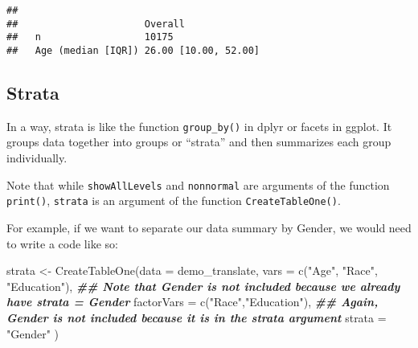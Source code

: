 \documentclass[
]{book}
\newenvironment{Shaded}{\begin{snugshade}}{\end{snugshade}}
\newcommand{\AttributeTok}[1]{\textcolor[rgb]{0.77,0.63,0.00}{#1}}
\newcommand{\DocumentationTok}[1]{\textcolor[rgb]{0.56,0.35,0.01}{\textbf{\textit{#1}}}}
\newcommand{\FunctionTok}[1]{\textcolor[rgb]{0.00,0.00,0.00}{#1}}
\newcommand{\NormalTok}[1]{#1}
\newcommand{\OtherTok}[1]{\textcolor[rgb]{0.56,0.35,0.01}{#1}}
\newcommand{\SpecialCharTok}[1]{\textcolor[rgb]{0.00,0.00,0.00}{#1}}
\newcommand{\StringTok}[1]{\textcolor[rgb]{0.31,0.60,0.02}{#1}}
\begin{document}
\begin{Shaded}
\end{Shaded}

\begin{verbatim}
##
##                      Overall
##   n                  10175
##   Age (median [IQR]) 26.00 [10.00, 52.00]
\end{verbatim}

\hypertarget{strata}{%
\subsection{Strata}\label{strata}}

In a way, strata is like the function \texttt{group\_by()} in dplyr or facets in ggplot. It groups data together into groups or ``strata'' and then summarizes each group individually.

Note that while \texttt{showAllLevels} and \texttt{nonnormal} are arguments of the function \texttt{print()}, \texttt{strata} is an argument of the function \texttt{CreateTableOne()}.

For example, if we want to separate our data summary by Gender, we would need to write a code like so:

\begin{Shaded}
\begin{Highlighting}[]
\NormalTok{strata }\OtherTok{\textless{}{-}} \FunctionTok{CreateTableOne}\NormalTok{(}\AttributeTok{data =}\NormalTok{ demo\_translate,}
                         \AttributeTok{vars =} \FunctionTok{c}\NormalTok{(}\StringTok{"Age"}\NormalTok{, }\StringTok{"Race"}\NormalTok{, }\StringTok{"Education"}\NormalTok{), }\DocumentationTok{\#\# Note that Gender is not included because we already have strata = Gender}
                         \AttributeTok{factorVars =} \FunctionTok{c}\NormalTok{(}\StringTok{"Race"}\NormalTok{,}\StringTok{"Education"}\NormalTok{), }\DocumentationTok{\#\# Again, Gender is not included because it is in the strata argument}
                         \AttributeTok{strata =} \StringTok{"Gender"}
\NormalTok{                         )}
\end{Highlighting}
\end{Shaded}
\end{document}
